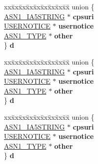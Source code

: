 \begin{DoxyCompactItemize}
\begin{tabbing}
\end{tabbing}\item 
\mbox{\label{structPOLICYQUALINFO__st_a34a371cf17b9d38d952df6c39dbc3873}} 
\begin{tabbing}
xx\=xx\=xx\=xx\=xx\=xx\=xx\=xx\=xx\=\kill
union \{\\
\>\hyperlink{structasn1__string__st}{ASN1\_IA5STRING} $\ast$ {\bfseries cpsuri}\\
\>\hyperlink{structUSERNOTICE__st}{USERNOTICE} $\ast$ {\bfseries usernotice}\\
\>\hyperlink{structasn1__type__st}{ASN1\_TYPE} $\ast$ {\bfseries other}\\
\} {\bfseries d}\\

\end{tabbing}\item 
\mbox{\label{structPOLICYQUALINFO__st_ab5616272670be28fc09916d568193987}} 
\begin{tabbing}
xx\=xx\=xx\=xx\=xx\=xx\=xx\=xx\=xx\=\kill
union \{\\
\>\hyperlink{structasn1__string__st}{ASN1\_IA5STRING} $\ast$ {\bfseries cpsuri}\\
\>\hyperlink{structUSERNOTICE__st}{USERNOTICE} $\ast$ {\bfseries usernotice}\\
\>\hyperlink{structasn1__type__st}{ASN1\_TYPE} $\ast$ {\bfseries other}\\
\} {\bfseries d}\\

\end{tabbing}\item 
\mbox{\label{structPOLICYQUALINFO__st_af7b2eae178303c03c6293183ed512282}} 
\begin{tabbing}
xx\=xx\=xx\=xx\=xx\=xx\=xx\=xx\=xx\=\kill
union \{\\
\>\hyperlink{structasn1__string__st}{ASN1\_IA5STRING} $\ast$ {\bfseries cpsuri}\\
\>\hyperlink{structUSERNOTICE__st}{USERNOTICE} $\ast$ {\bfseries usernotice}\\
\>\hyperlink{structasn1__type__st}{ASN1\_TYPE} $\ast$ {\bfseries other}\\
\} {\bfseries d}\\


\end{tabbing}
\end{DoxyCompactItemize}
